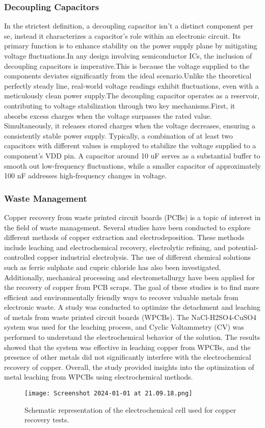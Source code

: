 \documentclass[../report.tex]{subfiles}
\begin{document}
  \subsubsection{Decoupling Capacitors}
  In the strictest definition, a decoupling capacitor isn't a distinct component per se, instead it characterizes a capacitor's role within an electronic circuit. 
  Its primary function is to enhance stability on the power supply plane by mitigating voltage fluctuations.In any design involving semiconductor ICs, the inclusion of decoupling capacitors is imperative.This is because the voltage supplied to the components deviates significantly from the ideal scenario.Unlike the theoretical perfectly steady line, real-world voltage readings exhibit fluctuations, even with a meticulously clean power supply.The decoupling capacitor operates as a reservoir, contributing to voltage stabilization through two key mechanisms.First, it absorbs excess charges when the voltage surpasses the rated value. Simultaneously, it releases stored charges when the voltage decreases, ensuring a consistently stable power supply.
  Typically, a combination of at least two capacitors with different values is employed to stabilize the voltage supplied to a component's VDD pin. A capacitor around 10 uF serves as a substantial buffer to smooth out low-frequency fluctuations, while a smaller capacitor of approximately 100 nF addresses high-frequency changes in voltage. 

\subsubsection{Waste Management}
Copper recovery from waste printed circuit boards (PCBs) is a topic of interest in the field of waste management. Several studies have been conducted to explore different methods of copper extraction and electrodeposition. These methods include leaching and electrochemical recovery, electrolytic refining, and potential-controlled copper industrial electrolysis. The use of different chemical solutions such as ferric sulphate and cupric chloride has also been investigated. Additionally, mechanical processing and electrometallurgy have been applied for the recovery of copper from PCB scraps. The goal of these studies is to find more efficient and environmentally friendly ways to recover valuable metals from electronic waste.
A study was conducted \cite{copper_recovery}  to optimize the detachment and leaching of metals from waste printed circuit boards (WPCBs). The NaCl-H2SO4-CuSO4 system was used for the leaching process, and Cyclic Voltammetry (CV) was performed to understand the electrochemical behavior of the solution. The results showed that the system was effective in leaching copper from WPCBs, and the presence of other metals did not significantly interfere with the electrochemical recovery of copper. Overall, the study provided insights into the optimization of metal leaching from WPCBs using electrochemical methods. 

\begin{figure}[H]
  \centering
  \texttt{[image: Screenshot 2024-01-01 at 21.09.18.png]}
  \caption{Schematic representation of the electrochemical cell used for copper recovery tests.}
\end{figure}   
\end{document}
